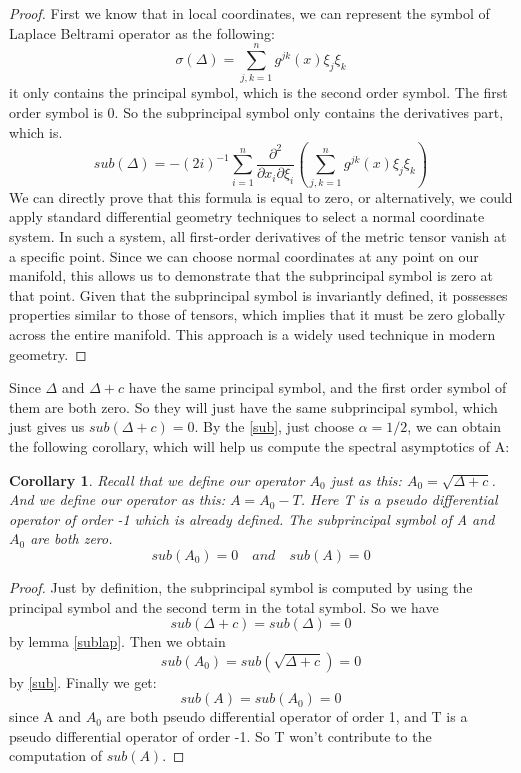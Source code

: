 \documentclass[10pt]{amsart}
\newtheorem{corr}[theorem]{Corollary}
\newcommand{\1}{\mathbb{1}}
\begin{document}
\begin{proof}
    First we know that in local coordinates, we can represent the symbol of Laplace Beltrami operator as the following:
    \[
    \sigma(\Delta) = \sum_{j,k=1}^n g^{jk}(x) \xi_j\xi_k
    \]
    it only contains the principal symbol, which is the second order symbol. The first order symbol is 0. So the subprincipal symbol only contains the derivatives part, which is.
    \[
    sub(\Delta) = -(2i)^{-1} \sum_{i=1}^n \frac{\partial^2}{\partial x_i\partial \xi_i} (\sum_{j,k=1}^n g^{jk}(x) \xi_j\xi_k)
    \]
    We can directly prove that this formula is equal to zero, or alternatively, we could apply standard differential geometry techniques to select a normal coordinate system. In such a system, all first-order derivatives of the metric tensor vanish at a specific point. Since we can choose normal coordinates at any point on our manifold, this allows us to demonstrate that the subprincipal symbol is zero at that point. Given that the subprincipal symbol is invariantly defined, it possesses properties similar to those of tensors, which implies that it must be zero globally across the entire manifold. This approach is a widely used technique in modern geometry.
\end{proof}

Since $\Delta$ and $\Delta +c$ have the same principal symbol, and the first order symbol of them are both zero. So they will just have the same subprincipal symbol, which just gives us $sub(\Delta +c) = 0$. By the \eqref{sub}, just choose $\alpha = 1/2$, we can obtain the following corollary, which will help us compute the spectral asymptotics of A:

\begin{corr}
    Recall that we define our operator $A_0$ just as this: $A_0 = \sqrt{\Delta + c}$. And we define our operator as this: $A = A_0 - T$. Here T is a pseudo differential operator of order -1 which is already defined. The subprincipal symbol of A and $A_0$ are both zero.
    \[
    sub(A_0) = 0 \quad and \quad sub(A) = 0
    \]
\end{corr}

\begin{proof}
    Just by definition, the subprincipal symbol is computed by using the principal symbol and the second term in the total symbol. So we have 
    \[
    sub(\Delta + c) = sub(\Delta) = 0
    \]
    by lemma \ref{sublap}. Then we obtain
    \[
    sub(A_0) = sub (\sqrt{\Delta + c}) = 0
    \]
    by \eqref{sub}. Finally we get: 
    \begin{equation}
        sub(A) = sub(A_0) = 0
    \end{equation}
    since A and $A_0$ are both pseudo differential operator of order 1, and T is a pseudo differential operator of order -1. So T won't contribute to the computation of $sub(A)$.
\end{proof}
\end{document}
